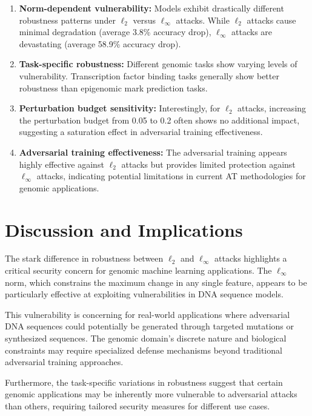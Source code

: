\documentclass{article} %
\begin{document}
\begin{enumerate}
    \item \textbf{Norm-dependent vulnerability:} Models exhibit drastically different robustness patterns under $\ell_2$ versus $\ell_\infty$ attacks. While $\ell_2$ attacks cause minimal degradation (average 3.8\% accuracy drop), $\ell_\infty$ attacks are devastating (average 58.9\% accuracy drop).
    
    \item \textbf{Task-specific robustness:} Different genomic tasks show varying levels of vulnerability. Transcription factor binding tasks generally show better robustness than epigenomic mark prediction tasks.
    
    \item \textbf{Perturbation budget sensitivity:} Interestingly, for $\ell_2$ attacks, increasing the perturbation budget from 0.05 to 0.2 often shows no additional impact, suggesting a saturation effect in adversarial training effectiveness.
    
    \item \textbf{Adversarial training effectiveness:} The adversarial training appears highly effective against $\ell_2$ attacks but provides limited protection against $\ell_\infty$ attacks, indicating potential limitations in current AT methodologies for genomic applications.
\end{enumerate}

\section{Discussion and Implications}

The stark difference in robustness between $\ell_2$ and $\ell_\infty$ attacks highlights a critical security concern for genomic machine learning applications. The $\ell_\infty$ norm, which constrains the maximum change in any single feature, appears to be particularly effective at exploiting vulnerabilities in DNA sequence models.

This vulnerability is concerning for real-world applications where adversarial DNA sequences could potentially be generated through targeted mutations or synthesized sequences. The genomic domain's discrete nature and biological constraints may require specialized defense mechanisms beyond traditional adversarial training approaches.

Furthermore, the task-specific variations in robustness suggest that certain genomic applications may be inherently more vulnerable to adversarial attacks than others, requiring tailored security measures for different use cases.
\end{document}
